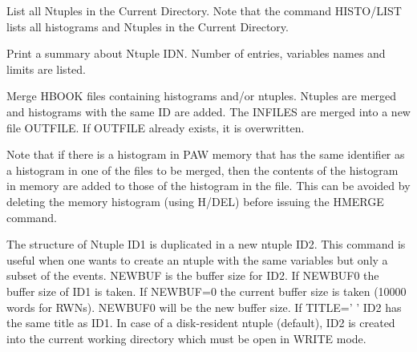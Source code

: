 \ENDCMD


   \par
List all Ntuples in the Current Directory.  Note that the command 
   HISTO/LIST lists all histograms and Ntuples in the Current Directory.  

\ENDCMD


\BEGARG
{}
\ENDARG

   \par
Print a summary about Ntuple IDN.  Number of entries, variables names and 
   limits are listed.  

\ENDCMD


\BEGARG
{}
\ENDARG

   \par
Merge HBOOK files containing histograms and/or ntuples. Ntuples are merged 
   and histograms with the same ID are added. The INFILES are merged into a 
   new file OUTFILE. If OUTFILE already exists, it is overwritten.  

   \par
Note that if there is a histogram in PAW memory that has the same 
   identifier as a histogram in one of the files to be merged, then the 
   contents of the histogram in memory are added to those of the histogram in 
   the file. This can be avoided by deleting the memory histogram (using 
   H/DEL) before issuing the HMERGE command.  

\ENDCMD


\BEGARG
{}
\ENDARG
{}
\DEFOPT{\EMPTY}{}
\ENDOPT

   \par
The structure of Ntuple ID1 is duplicated in a new ntuple ID2.  This 
   command is useful when one wants to create an ntuple with the same 
   variables but only a subset of the events. NEWBUF is the buffer size for 
   ID2. If NEWBUF\BRA{}0 the buffer size of ID1 is taken. If NEWBUF=0 the 
   current buffer size is taken (10000 words for RWNs). NEWBUF\KET{}0 will be 
   the new buffer size. If TITLE=' ' ID2 has the same title as ID1.  In case 
   of a disk-resident ntuple (default), ID2 is created into the current 
   working directory which must be open in WRITE mode.  

